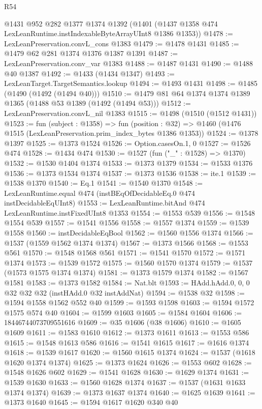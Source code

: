 \begin{lexlean}{R54}
\begin{coremodule}
    @1431
    @952
    @282
    @1377
    @1374
    @1392
    (@1401 (@1437 @1358 @474 LexLeanRuntime.instIndexableByteArrayUInt8 @1386 @1353))
@1478 := LexLeanPreservation.convL_cons @1383
@1479 := @1478 @1431
@1485 := @1479 @62 @281 @1374 @1376 @1387 @1391
@1487 := LexLeanPreservation.conv_var @1383
@1488 := @1487 @1431
@1490 := @1488 @40 @1387
@1492 := @1433 (@1434 @1347)
@1493 := LexLeanTarget.TargetSemantics.lookup
@1494 := @1493 @1431
@1498 := @1485 (@1490 (@1492 (@1494 @40)))
@1510 := @1479 @81 @64 @1374 @1374 @1389 @1365 (@1488 @53 @1389 (@1492 (@1494 @53)))
@1512 := LexLeanPreservation.convL_nil @1383
@1515 := @1498 (@1510 (@1512 @1431))
@1523 := fun (subject : @1358) =>
  fun (position : @32) => @1460 (@1476 @1515 (LexLeanPreservation.prim_index_bytes @1386 @1353))
@1524 := @1378 @1397
@1525 := @1373 @1524
@1526 := Option.casesOn.{1, 0}
@1527 := @1526 @474
@1528 := @1434 @474
@1530 := @1527 (fun ("_" : @1528) => @1370)
@1532 := @1530 @1404 @1374
@1533 := @1373 @1379
@1534 := @1533 @1376
@1536 := @1373 @1534 @1374
@1537 := @1373 @1536
@1538 := ite.{1}
@1539 := @1538 @1370
@1540 := Eq.{1}
@1541 := @1540 @1370
@1548 := LexLeanRuntime.equal @474 (instBEqOfDecidableEq.{0} @474 instDecidableEqUInt8)
@1553 := LexLeanRuntime.bitAnd @474 LexLeanRuntime.instFixedUInt8 @1353
@1554 := @1553 @539
@1556 := @1548 @1554 @539
@1557 := @1541 @1556
@1558 := @1557 @1374
@1559 := @1539 @1558
@1560 := instDecidableEqBool
@1562 := @1560 @1556 @1374
@1566 := @1537 (@1559 @1562 @1374 @1374)
@1567 := @1373 @1566
@1568 := @1553 @561
@1570 := @1548 @1568 @561
@1571 := @1541 @1570
@1572 := @1571 @1374
@1573 := @1539 @1572
@1575 := @1560 @1570 @1374
@1579 := @1537 (@1573 @1575 @1374 @1374)
@1581 := @1373 @1579 @1374
@1582 := @1567 @1581
@1583 := @1373 @1582
@1584 := Nat.blt
@1593 := HAdd.hAdd.{0, 0, 0} @32 @32 @32 (instHAdd.{0} @32 instAddNat)
@1594 := @1538 @32
@1598 := @1594 @1558 @1562 @552 @40
@1599 := @1593 @1598
@1603 := @1594 @1572 @1575 @574 @40
@1604 := @1599 @1603
@1605 := @1584 @1604
@1606 := 18446744073709551616
@1609 := @35 @1606 (@38 @1606)
@1610 := @1605 @1609
@1611 := @1583 @1610
@1612 := @1373 @1611
@1613 := @1553 @586
@1615 := @1548 @1613 @586
@1616 := @1541 @1615
@1617 := @1616 @1374
@1618 := @1539 @1617
@1620 := @1560 @1615 @1374
@1624 := @1537 (@1618 @1620 @1374 @1374)
@1625 := @1373 @1624
@1626 := @1553 @602
@1628 := @1548 @1626 @602
@1629 := @1541 @1628
@1630 := @1629 @1374
@1631 := @1539 @1630
@1633 := @1560 @1628 @1374
@1637 := @1537 (@1631 @1633 @1374 @1374)
@1639 := @1373 @1637 @1374
@1640 := @1625 @1639
@1641 := @1373 @1640
@1645 := @1594 @1617 @1620 @340 @40

\end{coremodule}
\end{lexlean}
